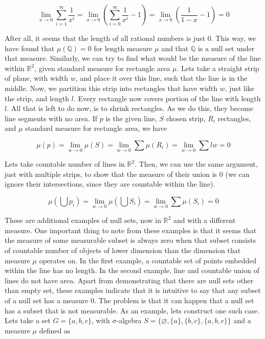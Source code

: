 \documentclass{article}
\begin{document}
\[ \lim_{x \to 0}\sum_{i=1}^{\infty}\frac{1}{x^i}=\lim_{x \to 0}(\sum_{i=0}^{\infty}\frac{1}{x^i}-1)=\lim_{x \to 0} (\frac{1}{1-x} - 1)=0 \]

After all, it seems that the length of all rational numbers is just 0. This way, we have found that $\mu(\mathbb{Q})=0$ for length measure $\mu$ and that $\mathbb{Q}$ is a null set under that measure.
\newline\indent Similarly, we can try to find what would be the measure of the line within $\mathbb{R}^2$, given standard measure for rectangle area $\mu$. Lets take a straight strip of plane, with width $w$, and place it over this line, such that the line is in the middle. Now, we partition this strip into rectangles that have width $w$, just like the strip, and length $l$. Every rectangle now covers portion of the line with length $l$. All that is left to do now, is to shrink rectangles. As we do this, they become line segments with no area. If $p$ is the given line, $S$ chosen strip, $R_i$ rectangles, and $\mu$ standard measure for rectangle area, we have

\[\mu(p)=\lim_{w \to 0}\mu(S)=\lim_{w \to 0}\sum\mu(R_i)=\lim_{w \to 0}\sum lw=0\]

Lets take countable number of lines in $\mathbb{R}^2$. Then, we can use the same argument, just with multiple strips, to show that the measure of their union is 0 (we can ignore their intersections, since they are countable within the line).

\[ \mu(\bigcup p_i) = \lim_{w \to 0}\mu(\bigcup S_i) = \lim_{w \to 0}\sum\mu(S_i) = 0 \]

These are additional examples of null sets, now in $\mathbb{R}^2$ and with a different measure. One important thing to note from these examples is that it seems that the measure of some measurable subset is always zero when that subset consists of countable number of objects of lower dimension than the dimension that measure $\mu$ operates on. In the first example, a countable set of points embedded within the line has no length. In the second example, line and countable union of lines do not have area. 
\newline\indent Apart from demonstrating that there are null sets other than empty set, these examples indicate that it is intuitive to say that any subset of a null set has a measure 0. The problem is that it can happen that a null set has a subset that is not measurable. As an example, lets construct one such case. Lets take a set $G=\{a,b,c\}$, with $\sigma$-algebra $S=\{\varnothing, \{a\},\{b,c\},\{a,b,c\}\}$ and a measure $\mu$ defined as
\end{document}
